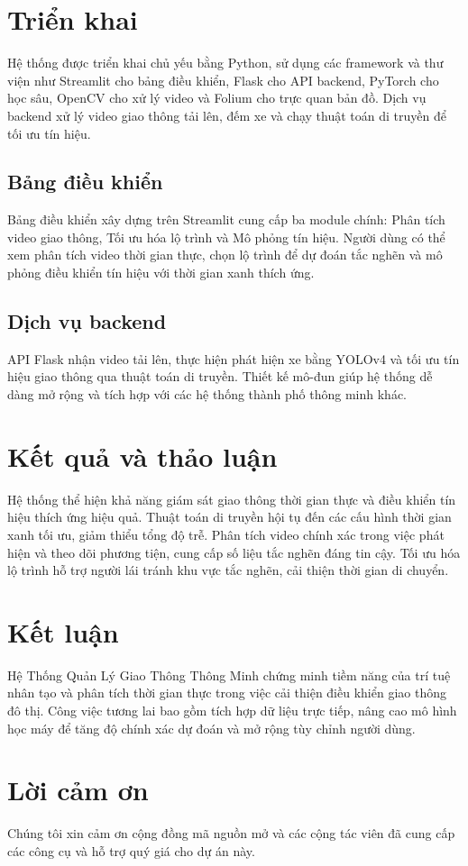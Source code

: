 \documentclass[conference]{IEEEtran}
\begin{document}
\section{Triển khai}
Hệ thống được triển khai chủ yếu bằng Python, sử dụng các framework và thư viện như Streamlit cho bảng điều khiển, Flask cho API backend, PyTorch cho học sâu, OpenCV cho xử lý video và Folium cho trực quan bản đồ. Dịch vụ backend xử lý video giao thông tải lên, đếm xe và chạy thuật toán di truyền để tối ưu tín hiệu.

\subsection{Bảng điều khiển}
Bảng điều khiển xây dựng trên Streamlit cung cấp ba module chính: Phân tích video giao thông, Tối ưu hóa lộ trình và Mô phỏng tín hiệu. Người dùng có thể xem phân tích video thời gian thực, chọn lộ trình để dự đoán tắc nghẽn và mô phỏng điều khiển tín hiệu với thời gian xanh thích ứng.

\subsection{Dịch vụ backend}
API Flask nhận video tải lên, thực hiện phát hiện xe bằng YOLOv4 và tối ưu tín hiệu giao thông qua thuật toán di truyền. Thiết kế mô-đun giúp hệ thống dễ dàng mở rộng và tích hợp với các hệ thống thành phố thông minh khác.

\section{Kết quả và thảo luận}
Hệ thống thể hiện khả năng giám sát giao thông thời gian thực và điều khiển tín hiệu thích ứng hiệu quả. Thuật toán di truyền hội tụ đến các cấu hình thời gian xanh tối ưu, giảm thiểu tổng độ trễ. Phân tích video chính xác trong việc phát hiện và theo dõi phương tiện, cung cấp số liệu tắc nghẽn đáng tin cậy. Tối ưu hóa lộ trình hỗ trợ người lái tránh khu vực tắc nghẽn, cải thiện thời gian di chuyển.

\section{Kết luận}
Hệ Thống Quản Lý Giao Thông Thông Minh chứng minh tiềm năng của trí tuệ nhân tạo và phân tích thời gian thực trong việc cải thiện điều khiển giao thông đô thị. Công việc tương lai bao gồm tích hợp dữ liệu trực tiếp, nâng cao mô hình học máy để tăng độ chính xác dự đoán và mở rộng tùy chỉnh người dùng.

\section*{Lời cảm ơn}
Chúng tôi xin cảm ơn cộng đồng mã nguồn mở và các cộng tác viên đã cung cấp các công cụ và hỗ trợ quý giá cho dự án này.



\end{document}

